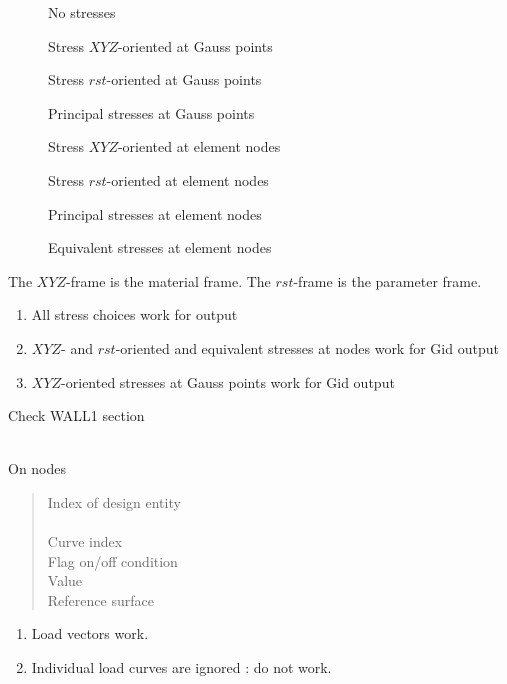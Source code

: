 \begin{description}
\item[] No stresses
\item[] Stress $XYZ$-oriented at Gauss points
\item[] Stress $rst$-oriented at Gauss points
\item[] Principal stresses at Gauss points
\item[] Stress $XYZ$-oriented at element nodes
\item[] Stress $rst$-oriented at element nodes
\item[] Principal stresses at element nodes
\item[] Equivalent stresses at element nodes
\end{description}
The $XYZ$-frame is the material frame. The $rst$-frame is the parameter
frame.
\begin{enumerate}
\item All stress choices work for  output
\item $XYZ$- and $rst$-oriented and equivalent stresses at nodes work for Gid
   output
\item $XYZ$-oriented stresses at Gauss points work for Gid
   output
\end{enumerate}

 Check WALL1 section

\\
On nodes
\begin{quote}
 \cnl \chs Index of design entity\\
\cod{-} \cnl\\
 \chs Curve index\\
 \cnl \chs Flag on/off condition \\
 \cnl \chs Value\\
 \chs Reference surface
\end{quote}
\begin{enumerate}
\item Load vectors work.
\item Individual load curves are ignored : do not work.
\end{enumerate}

